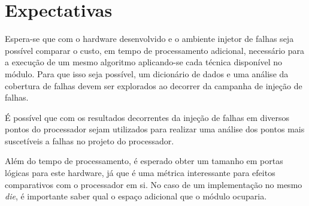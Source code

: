 \section{Expectativas}
Espera-se que com o hardware desenvolvido e o ambiente injetor de falhas seja possível comparar o custo, em tempo de processamento adicional, necessário para a execução de um mesmo algoritmo aplicando-se cada técnica disponível no módulo. Para que isso seja possível, um dicionário de dados e uma análise da cobertura de falhas devem ser explorados ao decorrer da campanha de injeção de falhas. 

É possível que com os resultados decorrentes da injeção de falhas em diversos pontos do processador sejam utilizados para realizar uma análise dos pontos mais suscetíveis a falhas no projeto do processador. 

Além do tempo de processamento, é esperado obter um tamanho em portas lógicas para este hardware, já que é uma métrica interessante para efeitos comparativos com o processador em si. No caso de um implementação no mesmo \textit{die}, é importante saber qual o espaço adicional que o módulo ocuparia.